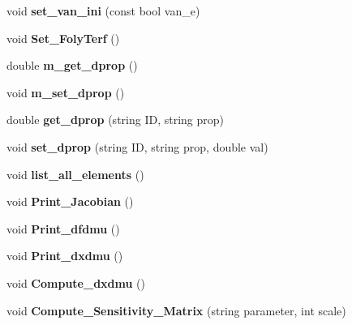 \begin{DoxyCompactItemize}
\item 
\hypertarget{class_staci_a0f2f821b672c0aa1a2f9a9117c2f67ef}{}\label{class_staci_a0f2f821b672c0aa1a2f9a9117c2f67ef} 
void {\bfseries set\+\_\+van\+\_\+ini} (const bool van\+\_\+e)
\item 
\hypertarget{class_staci_ae13ac77f30c2f64ffbc44e9b271373ef}{}\label{class_staci_ae13ac77f30c2f64ffbc44e9b271373ef} 
void {\bfseries Set\+\_\+\+Foly\+Terf} ()
\item 
\hypertarget{class_staci_a292d7cba265ab37d31bec35349fae1ac}{}\label{class_staci_a292d7cba265ab37d31bec35349fae1ac} 
double {\bfseries m\+\_\+get\+\_\+dprop} ()
\item 
\hypertarget{class_staci_a47fc932a04e285791a4cb4227e840004}{}\label{class_staci_a47fc932a04e285791a4cb4227e840004} 
void {\bfseries m\+\_\+set\+\_\+dprop} ()
\item 
\hypertarget{class_staci_af333518d7badd70d8ae324c0287a94e0}{}\label{class_staci_af333518d7badd70d8ae324c0287a94e0} 
double {\bfseries get\+\_\+dprop} (string ID, string prop)
\item 
\hypertarget{class_staci_a1028b9dd75388d7d3e42d10b31a9e6eb}{}\label{class_staci_a1028b9dd75388d7d3e42d10b31a9e6eb} 
void {\bfseries set\+\_\+dprop} (string ID, string prop, double val)
\item 
\hypertarget{class_staci_a690304659f0bf2283a4e5dc20177661f}{}\label{class_staci_a690304659f0bf2283a4e5dc20177661f} 
void {\bfseries list\+\_\+all\+\_\+elements} ()
\item 
\hypertarget{class_staci_a4f664e6fe326b5592664b2b7239612f2}{}\label{class_staci_a4f664e6fe326b5592664b2b7239612f2} 
void {\bfseries Print\+\_\+\+Jacobian} ()
\item 
\hypertarget{class_staci_abe8ddaf47c48ac2429acc5fe9c8010a5}{}\label{class_staci_abe8ddaf47c48ac2429acc5fe9c8010a5} 
void {\bfseries Print\+\_\+dfdmu} ()
\item 
\hypertarget{class_staci_ac3b009354096542602b5a6849f5114d2}{}\label{class_staci_ac3b009354096542602b5a6849f5114d2} 
void {\bfseries Print\+\_\+dxdmu} ()
\item 
\hypertarget{class_staci_abf31b6f78c548e42970b98941d35aba9}{}\label{class_staci_abf31b6f78c548e42970b98941d35aba9} 
void {\bfseries Compute\+\_\+dxdmu} ()
\item 
\hypertarget{class_staci_afc29a7cbf16da192dfdece5f689546e5}{}\label{class_staci_afc29a7cbf16da192dfdece5f689546e5} 
void {\bfseries Compute\+\_\+\+Sensitivity\+\_\+\+Matrix} (string parameter, int scale)
\item 

\end{DoxyCompactItemize}
